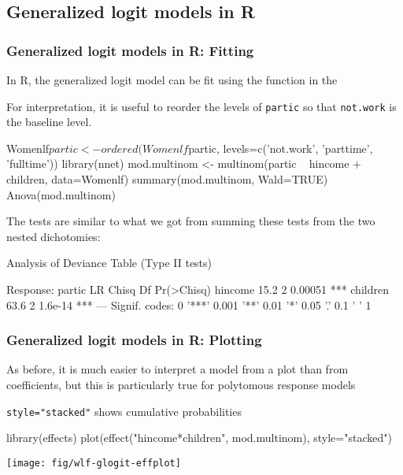 \renewcommand{\FileName}{genlogitR}
\subsection{Generalized logit models in R}
\begin{frame}[fragile]
  \frametitle{Generalized logit models in R: Fitting}
  \begin{itemize*}
    \item In R, the generalized logit model can be fit using the  function in the 
	\item For interpretation, it is useful to reorder the levels of \texttt{partic} so that \texttt{not.work}
	is the baseline level.
  \end{itemize*}
  
\begin{Rin}
Womenlf$partic <- ordered(Womenlf$partic, 
    levels=c('not.work', 'parttime', 'fulltime'))
library(nnet)
mod.multinom <- multinom(partic ~ hincome + children, data=Womenlf)
summary(mod.multinom, Wald=TRUE)
Anova(mod.multinom)
\end{Rin}

The  tests are similar to what we got from summing these tests from the
two nested dichotomies:
\begin{Rout}[baselinestretch=0.8,fontsize=\footnotesize,frame=single]
Analysis of Deviance Table (Type II tests)

Response: partic
         LR Chisq Df Pr(>Chisq)    
hincome      15.2  2    0.00051 ***
children     63.6  2    1.6e-14 ***
---
Signif. codes:  0 '***' 0.001 '**' 0.01 '*' 0.05 '.' 0.1 ' ' 1 
\end{Rout}
\end{frame}

\begin{frame}[fragile]
  \frametitle{Generalized logit models in R: Plotting}
  \begin{itemize*}
  	\item As before, it is much easier to interpret a model from a plot than from
  	coefficients, but this is particularly true for polytomous response models
    \item \texttt{style="stacked"} shows cumulative probabilities
  \end{itemize*}
\begin{Rin}
library(effects)
plot(effect("hincome*children", mod.multinom), style="stacked")
\end{Rin}
\begin{center}
	\texttt{[image: fig/wlf-glogit-effplot]}
\end{center}
\end{frame}

